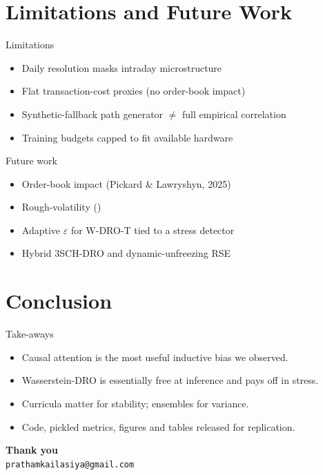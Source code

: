 \documentclass[aspectratio=169,10pt]{beamer}
\begin{document}
\section{Limitations and Future Work}

\begin{frame}{Limitations}
\begin{itemize}
\item Daily resolution masks intraday microstructure
\item Flat transaction-cost proxies (no order-book impact)
\item Synthetic-fallback path generator $\ne$ full empirical correlation
\item Training budgets capped to fit available hardware
\end{itemize}
\end{frame}

\begin{frame}{Future work}
\begin{itemize}
\item Order-book impact (Pickard \& Lawryshyn, 2025)
\item Rough-volatility (\citealp{horvath2021deep})
\item Adaptive $\varepsilon$ for W-DRO-T tied to a stress detector
\item Hybrid 3SCH-DRO and dynamic-unfreezing RSE
\end{itemize}
\end{frame}

\section{Conclusion}

\begin{frame}{Take-aways}
\begin{itemize}
\item Causal attention is the most useful inductive bias we observed.
\item Wasserstein-DRO is essentially free at inference and pays off in stress.
\item Curricula matter for stability; ensembles for variance.
\item Code, pickled metrics, figures and tables released for replication.
\end{itemize}
\end{frame}

\begin{frame}[plain]
\centering\Huge\textbf{Thank you}\\[6mm]
\Large \texttt{prathamkailasiya@gmail.com}
\end{frame}
\end{document}
